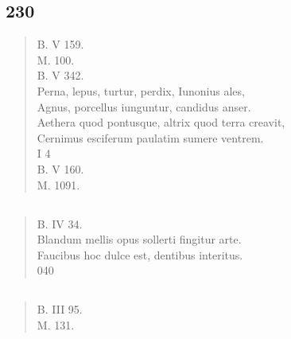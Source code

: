 \documentclass[11pt, a4paper]{report}
\begin{document}
            \subsection*{230}
      \begin{verse}
      B. V 159. \\ M. 100. \\ B. V 342. \\ Perna, lepus, turtur, perdix, Iunonius ales, \\ Agnus, porcellus iunguntur, candidus anser. \\ Aethera quod pontusque, altrix quod terra creavit, \\ Cernimus esciferum paulatim sumere ventrem. \\ I 4 \\ B. V 160. \\ M. 1091. \\ 
      \end{verse}
  
            \subsection*{}
      \begin{verse}
      B. IV 34. \\ Blandum mellis opus sollerti fingitur arte. \\ Faucibus hoc dulce est, dentibus interitus. \\ 040 \\ 
      \end{verse}
  
            \subsection*{}
      \begin{verse}
      B. III 95. \\ M. 131. \\ 
      \end{verse}
  
\end{document}
